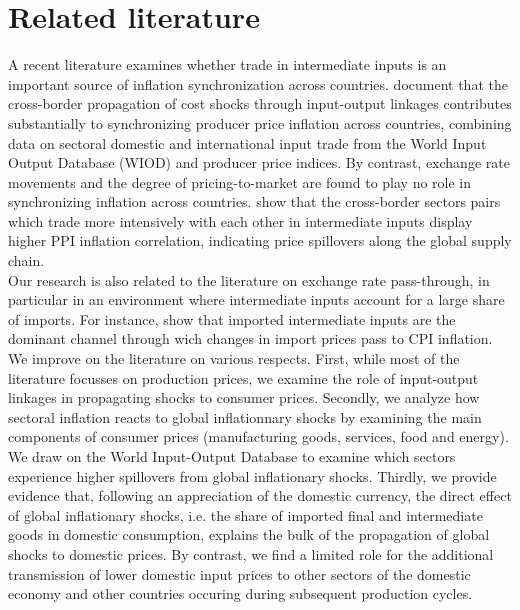\documentclass[11pt,a4paper]{article}
\begin{document}
\section{Related literature}
\label{sec:lit}
A recent literature examines whether trade in intermediate inputs is an important source of inflation synchronization across countries.
\cite{Auer2017} document that the cross-border propagation of cost shocks through input-output
linkages contributes substantially to synchronizing producer price inflation across countries, combining data on sectoral domestic and international input trade from the World Input Output
Database (WIOD) and producer price indices. By contrast, exchange rate movements and the degree of pricing-to-market are found to play no role in synchronizing inflation across countries.
\cite{AntoundeAlmeida2016} show that the cross-border sectors pairs which trade more intensively with each other in intermediate inputs display higher PPI inflation correlation, indicating  price spillovers along the global supply chain.\\
Our research is also related to the literature on exchange rate pass-through, in particular in an environment where intermediate inputs account for a large share of imports. For instance,  \cite{Goldberg2010} show that imported intermediate inputs are the dominant channel through wich changes in import prices pass to CPI inflation.\\
We improve on the literature on various respects. First, while most of the literature focusses on production prices, we examine the role of input-output linkages in propagating shocks to consumer prices. 
Secondly, we analyze how sectoral inflation reacts to global inflationnary shocks by examining the main components of consumer prices (manufacturing goods, services, food and energy).  We draw on the World Input-Output Database to examine which sectors experience higher spillovers from global inflationary shocks.
Thirdly, we provide evidence that, following an appreciation of the domestic currency, the direct effect of global inflationary shocks, i.e. the share of imported final and intermediate goods in domestic consumption, explains the bulk of the propagation of global shocks to domestic prices. By contrast, we find a limited role for the additional transmission of lower domestic input prices to other sectors of the domestic economy and other countries occuring during subsequent production cycles.
\end{document}
